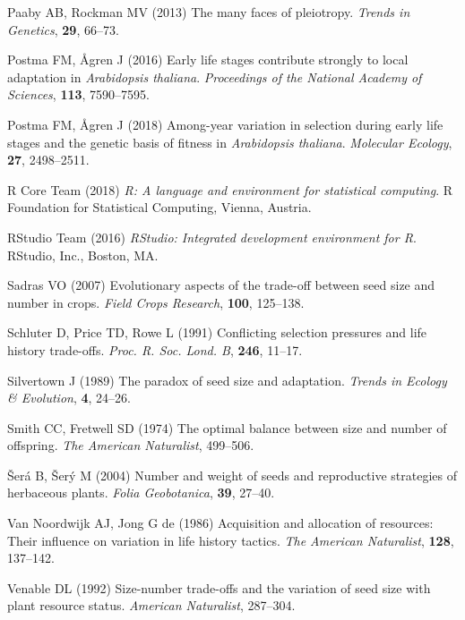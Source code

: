 \documentclass[12pt,]{article}
\begin{document}
\leavevmode\hypertarget{ref-paaby2013many}{}%
Paaby AB, Rockman MV (2013) The many faces of pleiotropy. \emph{Trends in Genetics}, \textbf{29}, 66--73.

\leavevmode\hypertarget{ref-postma_early_2016}{}%
Postma FM, Ågren J (2016) Early life stages contribute strongly to local adaptation in \emph{Arabidopsis thaliana}. \emph{Proceedings of the National Academy of Sciences}, \textbf{113}, 7590--7595.

\leavevmode\hypertarget{ref-postma2018among}{}%
Postma FM, Ågren J (2018) Among-year variation in selection during early life stages and the genetic basis of fitness in \emph{Arabidopsis thaliana}. \emph{Molecular Ecology}, \textbf{27}, 2498--2511.

\leavevmode\hypertarget{ref-RCT2015}{}%
R Core Team (2018) \emph{R: A language and environment for statistical computing}. R Foundation for Statistical Computing, Vienna, Austria.

\leavevmode\hypertarget{ref-RStudioTeam2015}{}%
RStudio Team (2016) \emph{RStudio: Integrated development environment for R}. RStudio, Inc., Boston, MA.

\leavevmode\hypertarget{ref-Sadras2007}{}%
Sadras VO (2007) Evolutionary aspects of the trade-off between seed size and number in crops. \emph{Field Crops Research}, \textbf{100}, 125--138.

\leavevmode\hypertarget{ref-schluter1991conflicting}{}%
Schluter D, Price TD, Rowe L (1991) Conflicting selection pressures and life history trade-offs. \emph{Proc. R. Soc. Lond. B}, \textbf{246}, 11--17.

\leavevmode\hypertarget{ref-Silvertown1989}{}%
Silvertown J (1989) The paradox of seed size and adaptation. \emph{Trends in Ecology \& Evolution}, \textbf{4}, 24--26.

\leavevmode\hypertarget{ref-Smith1974}{}%
Smith CC, Fretwell SD (1974) The optimal balance between size and number of offspring. \emph{The American Naturalist}, 499--506.

\leavevmode\hypertarget{ref-Sera2004}{}%
Šerá B, Šerý M (2004) Number and weight of seeds and reproductive strategies of herbaceous plants. \emph{Folia Geobotanica}, \textbf{39}, 27--40.

\leavevmode\hypertarget{ref-VanNoordwijk1986}{}%
Van Noordwijk AJ, Jong G de (1986) Acquisition and allocation of resources: Their influence on variation in life history tactics. \emph{The American Naturalist}, \textbf{128}, 137--142.

\leavevmode\hypertarget{ref-Venable1992}{}%
Venable DL (1992) Size-number trade-offs and the variation of seed size with plant resource status. \emph{American Naturalist}, 287--304.
\end{document}
